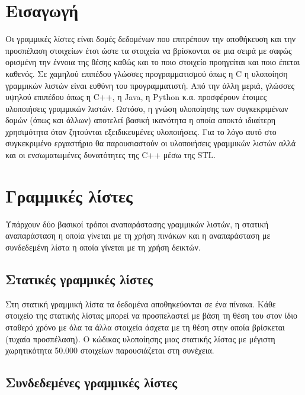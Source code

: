 \section{Εισαγωγή}
Οι γραμμικές λίστες είναι δομές δεδομένων που επιτρέπουν την αποθήκευση και την προσπέλαση στοιχείων έτσι ώστε τα στοιχεία να βρίσκονται σε μια σειρά με σαφώς ορισμένη την έννοια της θέσης καθώς και το ποιο στοιχείο προηγείται και ποιο έπεται καθενός. Σε χαμηλού επιπέδου γλώσσες προγραμματισμού όπως η C η υλοποίηση γραμμικών λιστών είναι ευθύνη του προγραμματιστή. Από την άλλη μεριά, γλώσσες υψηλού επιπέδου όπως η C++, η Java, η Python κ.α. προσφέρουν έτοιμες υλοποιήσεις γραμμικών λιστών. Ωστόσο, η γνώση υλοποίησης των συγκεκριμένων δομών (όπως και άλλων) αποτελεί βασική ικανότητα η οποία αποκτά ιδιαίτερη χρησιμότητα όταν ζητούνται εξειδικευμένες υλοποιήσεις. Για το λόγο αυτό στο συγκεκριμένο εργαστήριο θα παρουσιαστούν οι υλοποιήσεις γραμμικών λιστών αλλά και οι ενσωματωμένες δυνατότητες της C++ μέσω της STL.

\section{Γραμμικές λίστες}
Υπάρχουν δύο βασικοί τρόποι αναπαράστασης γραμμικών λιστών, η στατική αναπαράσταση η οποία γίνεται με τη χρήση πινάκων και η αναπαράσταση με συνδεδεμένη λίστα η οποία γίνεται με τη χρήση δεικτών. 

\subsection{Στατικές γραμμικές λίστες}
Στη στατική γραμμική λίστα τα δεδομένα αποθηκεύονται σε ένα πίνακα. Κάθε στοιχείο της στατικής λίστας μπορεί να προσπελαστεί με βάση τη θέση του στον ίδιο σταθερό χρόνο με όλα τα άλλα στοιχεία άσχετα με τη θέση στην οποία βρίσκεται (τυχαία προσπέλαση). Ο κώδικας υλοποίησης μιας στατικής λίστας με μέγιστη χωρητικότητα 50.000 στοιχείων παρουσιάζεται στη συνέχεια.








\subsection{Συνδεδεμένες γραμμικές λίστες}


